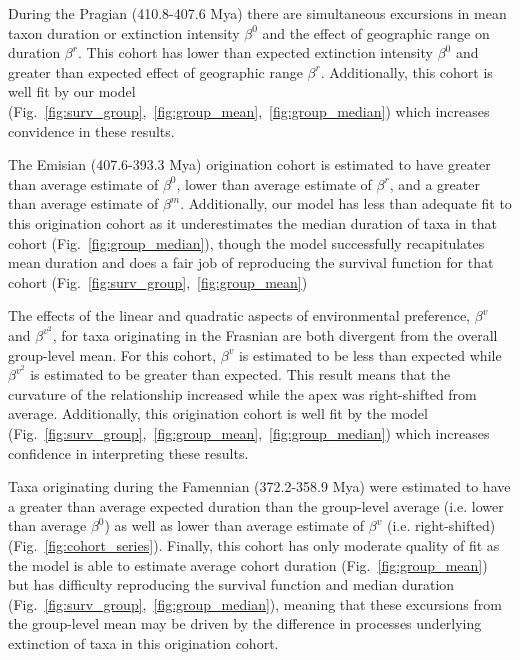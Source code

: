 \documentclass[11pt]{article}
\begin{document}
During the Pragian (410.8-407.6 Mya) there are simultaneous excursions in mean taxon duration or extinction intensity \(\beta^{0}\) and the effect of geographic range on duration \(\beta^{r}\). This cohort has lower than expected extinction intensity \(\beta^{0}\) and greater than expected effect of geographic range \(\beta^{r}\). Additionally, this cohort is well fit by our model (Fig.~\ref{fig:surv_group},~\ref{fig:group_mean},~\ref{fig:group_median}) which increases convidence in these results. %

The Emisian (407.6-393.3 Mya) origination cohort is estimated to have greater than average estimate of \(\beta^{0}\), lower than average estimate of \(\beta^{r}\), and a greater than average estimate of \(\beta^{m}\). Additionally, our model has less than adequate fit to this origination cohort as it underestimates the median duration of taxa in that cohort (Fig.~\ref{fig:group_median}), though the model successfully recapitulates mean duration and does a fair job of reproducing the survival function for that cohort (Fig.~\ref{fig:surv_group},~\ref{fig:group_mean})

The effects of the linear and quadratic aspects of environmental preference, \(\beta^{v}\) and \(\beta^{v^{2}}\), for taxa originating in the Frasnian are both divergent from the overall group-level mean. For this cohort, \(\beta^{v}\) is estimated to be less than expected while \(\beta^{v^{2}}\) is estimated to be greater than expected. This result means that the curvature of the relationship increased while the apex was right-shifted from average. Additionally, this origination cohort is well fit by the model (Fig.~\ref{fig:surv_group},~\ref{fig:group_mean},~\ref{fig:group_median}) which increases confidence in interpreting these results.

Taxa originating during the Famennian (372.2-358.9 Mya) were estimated to have a greater than average expected duration than the group-level average (i.e. lower than average \(\beta^{0}\)) as well as lower than average estimate of \(\beta^{v}\) (i.e. right-shifted) (Fig.~\ref{fig:cohort_series}). Finally, this cohort has only moderate quality of fit as the model is able to estimate average cohort duration (Fig.~\ref{fig:group_mean}) but has difficulty reproducing the survival function and median duration (Fig.~\ref{fig:surv_group},~\ref{fig:group_median}), meaning that these excursions from the group-level mean may be driven by the difference in processes underlying extinction of taxa in this origination cohort.
\end{document}
